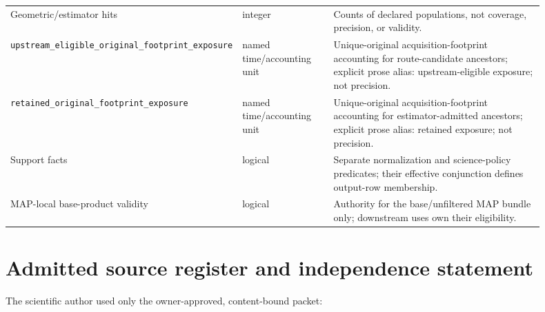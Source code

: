 \documentclass[10pt]{article}
\newcommand{\code}[1]{\nolinkurl{#1}}
\begin{document}
\begin{longtable}{L{0.23\linewidth}L{0.18\linewidth}L{0.49\linewidth}}
Geometric/estimator hits & integer & Counts of declared populations, not
coverage, precision, or validity.\\
\code{upstream_eligible_original_footprint_exposure} & named time/accounting
unit & Unique-original acquisition-footprint accounting for route-candidate
ancestors; explicit prose alias: upstream-eligible exposure; not precision.\\
\code{retained_original_footprint_exposure} & named time/accounting unit &
Unique-original acquisition-footprint accounting for estimator-admitted
ancestors; explicit prose alias: retained exposure; not precision.\\
Support facts & logical & Separate normalization and science-policy predicates;
their effective conjunction defines output-row membership.\\
MAP-local base-product validity & logical & Authority for the base/unfiltered
MAP bundle only; downstream uses own their eligibility.\\
\bottomrule
\end{longtable}

\clearpage
\section{Admitted source register and independence statement}

The scientific author used only the owner-approved, content-bound packet:
\end{document}
